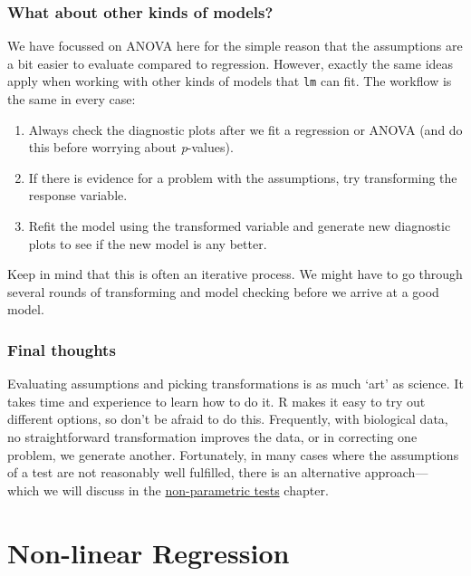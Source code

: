\documentclass[
]{book}
\providecommand{\tightlist}{%
  \setlength{\itemsep}{0pt}\setlength{\parskip}{0pt}}
\begin{document}
\hypertarget{what-about-other-kinds-of-models}{%
\section{What about other kinds of models?}\label{what-about-other-kinds-of-models}}

We have focussed on ANOVA here for the simple reason that the assumptions are a bit easier to evaluate compared to regression. However, exactly the same ideas apply when working with other kinds of models that \texttt{lm} can fit. The workflow is the same in every case:

\begin{enumerate}
\def\labelenumi{\arabic{enumi}.}
\tightlist
\item
  Always check the diagnostic plots after we fit a regression or ANOVA (and do this before worrying about \emph{p}-values).
\item
  If there is evidence for a problem with the assumptions, try transforming the response variable.
\item
  Refit the model using the transformed variable and generate new diagnostic plots to see if the new model is any better.
\end{enumerate}

Keep in mind that this is often an iterative process. We might have to go through several rounds of transforming and model checking before we arrive at a good model.

\hypertarget{final-thoughts}{%
\section{Final thoughts}\label{final-thoughts}}

Evaluating assumptions and picking transformations is as much `art' as science. It takes time and experience to learn how to do it. R makes it easy to try out different options, so don't be afraid to do this. Frequently, with biological data, no straightforward transformation improves the data, or in correcting one problem, we generate another. Fortunately, in many cases where the assumptions of a test are not reasonably well fulfilled, there is an alternative approach--- which we will discuss in the \protect\hyperlink{non-parametric-tests}{non-parametric tests} chapter.

\hypertarget{part-non-linear-regression}{%
\part{Non-linear Regression}\label{part-non-linear-regression}}
\end{document}
